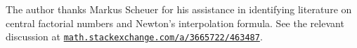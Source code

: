 The author thanks Markus Scheuer for his assistance in identifying literature on central factorial numbers and Newton's interpolation formula. See the relevant discussion at \href{https://math.stackexchange.com/a/3665722/463487}{\texttt{math.stackexchange.com/a/3665722/463487}}.
